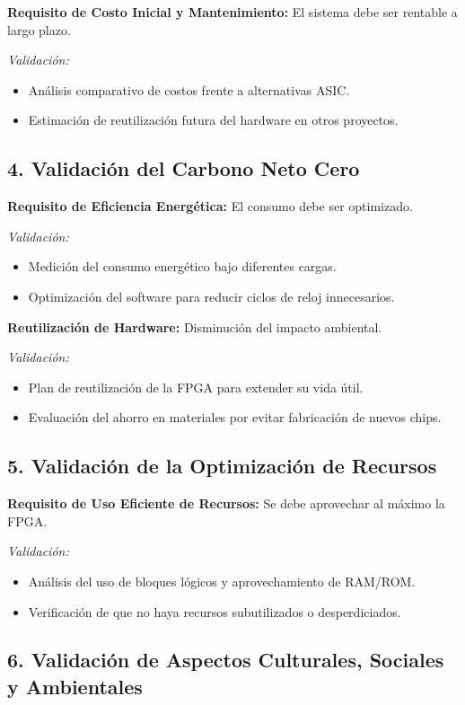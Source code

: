 \documentclass[conference]{IEEEtran}
\begin{document}
\textbf{Requisito de Costo Inicial y Mantenimiento:} El sistema debe ser rentable a largo plazo.

\textit{Validación:}
\begin{itemize}
	\item Análisis comparativo de costos frente a alternativas ASIC.
	\item Estimación de reutilización futura del hardware en otros proyectos.
\end{itemize}

\subsection*{4. Validación del Carbono Neto Cero}

\textbf{Requisito de Eficiencia Energética:} El consumo debe ser optimizado.

\textit{Validación:}
\begin{itemize}
	\item Medición del consumo energético bajo diferentes cargas.
	\item Optimización del software para reducir ciclos de reloj innecesarios.
\end{itemize}

\textbf{Reutilización de Hardware:} Disminución del impacto ambiental.

\textit{Validación:}
\begin{itemize}
	\item Plan de reutilización de la FPGA para extender su vida útil.
	\item Evaluación del ahorro en materiales por evitar fabricación de nuevos chips.
\end{itemize}

\subsection*{5. Validación de la Optimización de Recursos}

\textbf{Requisito de Uso Eficiente de Recursos:} Se debe aprovechar al máximo la FPGA.

\textit{Validación:}
\begin{itemize}
	\item Análisis del uso de bloques lógicos y aprovechamiento de RAM/ROM.
	\item Verificación de que no haya recursos subutilizados o desperdiciados.
\end{itemize}

\subsection*{6. Validación de Aspectos Culturales, Sociales y Ambientales}
\end{document}
